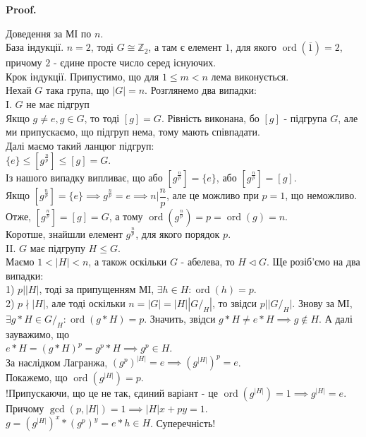\documentclass[a4paper, 10pt]{article}
\makeatletter
\theoremstyle{theoremdd}
\theoremstyle{theoremdd}
\theoremstyle{theoremdd}
\theoremstyle{theoremdd}
\theoremstyle{theoremdd}
\theoremstyle{theoremdd}
\theoremstyle{theoremdd}
\theoremstyle{theoremdd}
\theoremstyle{theoremdd}
\theoremstyle{theoremdd}
\theoremstyle{theoremdd}
\theoremstyle{theoremdd}
\theoremstyle{theoremdd}
\theoremstyle{theoremdd}
\theoremstyle{theoremdd}
\renewenvironment{proof}[1][Proof.\\]{\par
\pushQED{\hfill \qed}%
\normalfont \topsep6\p@\@plus6\p@\relax
\trivlist
\item\relax
{\bfseries
#1\@addpunct{.}}\hspace\labelsep\ignorespaces
}{%
\popQED\endtrivlist\@endpefalse
}
\DeclareMathOperator{\ord}{ord}
\makeatother
\begin{document}
\begin{proof}
Доведення за МІ по $n$.\\
База індукції. $n = 2$, тоді $G \cong \mathbb{Z}_2$, а там є елемент $1$, для якого $\ord(\overline{1}) = 2$, причому $2$ - єдине просте число серед існуючих.\\
Крок індукції. Припустимо, що для $1 \leq m < n$ лема виконується.\\
Нехай $G$ така група, що $|G| = n$. Розглянемо два випадки:\\
I. $G$ не має підгруп\\
Якщо $g \neq e, g \in G$, то тоді $[g] = G$. Рівність виконана, бо $[g]$ - підгрупа $G$, але ми припускаємо, що підгруп нема, тому мають співпадати.\\
Далі маємо такий ланцюг підгруп:\\
$\{e\} \leq [g^{\frac{n}{p}}] \leq [g] = G$.\\
Із нашого випадку випливає, що або $[g^{\frac{n}{p}}] = \{e\}$, або $[g^{\frac{n}{p}}] = [g]$.\\
Якщо $[g^{\frac{n}{p}}] = \{e\} \implies g^{\frac{n}{p}} = e \implies n | \dfrac{n}{p}$, але це можливо при $p=1$, що неможливо.\\
Отже, $[g^{\frac{n}{p}}] = [g] = G$, а тому $\ord(g^{\frac{n}{p}}) = p = \ord(g) = n$.\\
Коротше, знайшли елемент $g^{\frac{n}{p}}$, для якого порядок $p$.
\bigskip \\
II. $G$ має підгрупу $H \leq G$.\\
Маємо $1 < |H| < n$, а також оскільки $G$ - абелева, то $H \triangleleft G$. Ще розіб'ємо на два випадки:\\
1) $p | |H|$, тоді за припущенням МІ, $\exists h \in H: \ord(h) = p$.\\
2) $p \nmid |H|$, але тоді оскільки $n = |G| = |H| |G/_H|$, то звідси $p | |G/_H|$. Знову за МІ, $\exists g*H \in G/_H: \ord(g*H) = p$. Значить, звідси $g*H \neq e*H \implies g \not\in H$. А далі зауважимо, що\\
$e*H = (g*H)^p = g^p*H \implies g^p \in H$.\\
За наслідком Лагранжа, $(g^p)^{|H|} = e \implies (g^{|H|})^p = e$.\\
Покажемо, що $\ord(g^{|H|}) = p$. \\
!Припускаючи, що це не так, єдиний варіант - це $\ord(g^{|H|}) = 1 \implies g^{|H|} = e$. Причому $\gcd(p,|H|) = 1 \implies |H|x+py = 1$.\\
$g = (g^{|H|})^x * (g^p)^y = e*h \in H$. Суперечність!
\end{proof}
\end{document}
